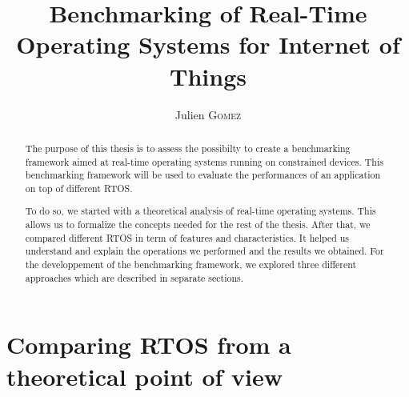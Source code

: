 \documentclass{EPL-master-thesis-covers-EN}
\title{Benchmarking of Real-Time Operating Systems for Internet of Things}
\author{Julien \textsc{Gomez}}
\begin{document}
  \maketitle

\cleardoublepage
{}

 \begin{abstract}

    The purpose of this thesis is to assess the possibilty to create a benchmarking framework aimed at 
      real-time operating systems running on constrained devices. 
    This benchmarking framework will be used to evaluate the performances of an application on top of different RTOS.

    To do so, we started with a theoretical analysis of real-time operating systems.
    This allows us to formalize the concepts needed for the rest of the thesis.
    After that, we compared different RTOS in term of features and characteristics.
    It helped us understand and explain the operations we performed and the results we obtained.
    For the developpement of the benchmarking framework, we explored three different approaches which are described in separate sections.
    
    
 \end{abstract}

 \renewcommand{\contentsname}{Content} %

{\hypersetup{hidelinks=true}
\tableofcontents
}

\cleardoublepage
{}



\part{Comparing RTOS from a theoretical point of view}



\end{document}
